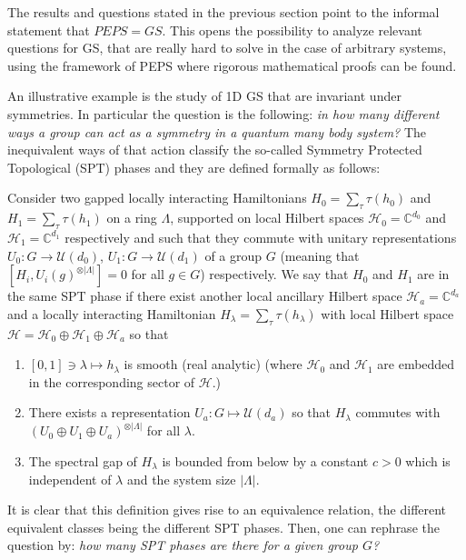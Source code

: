 \documentclass[smallextended]{svjour3}
\renewcommand{\1}{\mathbbm{1}}
\newcommand{\C}{\mathbb{C}}
\begin{document}
The results and questions stated in the previous section point to the informal statement that $PEPS = GS$. This opens the possibility to analyze relevant questions  for GS, that are really hard to solve in the case of arbitrary systems, using the framework of PEPS where rigorous mathematical proofs can be found.

An illustrative example is the study of 1D GS that are invariant under symmetries. In particular the question is the following: {\it in how many different ways a group can act as a symmetry in a quantum many body system?} The inequivalent ways of that action classify the so-called Symmetry Protected Topological (SPT) phases and they are defined formally as follows:

\begin{definition}
    Consider two gapped locally interacting Hamiltonians $H_0=\sum_\tau \tau(h_0)$ and $H_1=\sum_\tau \tau(h_1)$ on a ring $\Lambda$,  supported on local Hilbert spaces $\mathcal{H}_0=\C^{d_0}$ and $\mathcal{H}_1=\C^{d_1}$ respectively and such that they commute with unitary representations $U_0:G\rightarrow  \mathcal{U}(d_0)$, $U_1:G\rightarrow  \mathcal{U}(d_1)$ of a group $G$ (meaning that $[H_i,U_i(g)^{\otimes |\Lambda|}]=0$ for all $g\in G$) respectively. We say that $H_0$ and $H_1$ are in the same SPT phase if there exist another local ancillary Hilbert space $\mathcal{H}_a=\C^{d_a}$ and a locally interacting Hamiltonian $H_\lambda=\sum_\tau \tau(h_\lambda)$ with local Hilbert space $\mathcal{H}=\mathcal{H}_0\oplus  \mathcal{H}_1\oplus  \mathcal{H}_a$ so that
    \begin{enumerate}
        \item $[0,1]\ni\lambda\mapsto h_\lambda$ is smooth (real analytic) (where $\mathcal{H}_0$ and $\mathcal{H}_1$ are embedded in the corresponding sector of $\mathcal{H}$.)
        \item There exists a representation $U_a:G\mapsto \mathcal{U}( d_a)$ so that $H_\lambda$ commutes with $(U_0\oplus U_1\oplus U_a)^{\otimes |\Lambda|}$  for all $\lambda$.
        \item The spectral gap of $H_\lambda$ is bounded from below by a constant $c>0$ which is independent of $\lambda$ and the system size $|\Lambda|$.
    \end{enumerate}
\end{definition}

It is clear that this definition gives rise to an equivalence relation, the different equivalent classes being the different SPT phases. Then, one can rephrase the question by: \emph{how many SPT phases are there for a given group $G$?}
\end{document}
